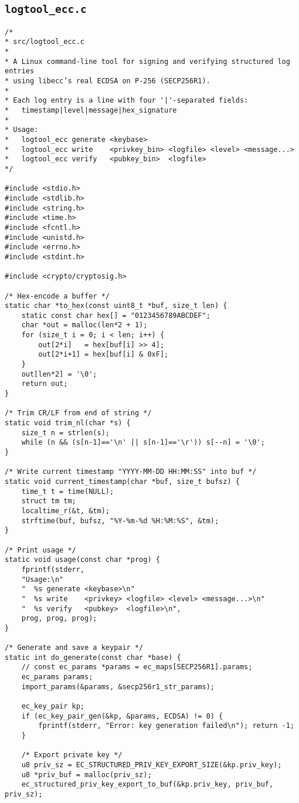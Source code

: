 \subsection*{\texttt{logtool\_ecc.c}}
\begin{lstlisting}[style=cstyle]
/*
* src/logtool_ecc.c
*
* A Linux command-line tool for signing and verifying structured log entries
* using libecc’s real ECDSA on P-256 (SECP256R1).
*
* Each log entry is a line with four '|'-separated fields:
*   timestamp|level|message|hex_signature
*
* Usage:
*   logtool_ecc generate <keybase>
*   logtool_ecc write    <privkey_bin> <logfile> <level> <message...>
*   logtool_ecc verify   <pubkey_bin>  <logfile>
*/

#include <stdio.h>
#include <stdlib.h>
#include <string.h>
#include <time.h>
#include <fcntl.h>
#include <unistd.h>
#include <errno.h>
#include <stdint.h>

#include <crypto/cryptosig.h>

/* Hex-encode a buffer */
static char *to_hex(const uint8_t *buf, size_t len) {
	static const char hex[] = "0123456789ABCDEF";
	char *out = malloc(len*2 + 1);
	for (size_t i = 0; i < len; i++) {
		out[2*i]   = hex[buf[i] >> 4];
		out[2*i+1] = hex[buf[i] & 0xF];
	}
	out[len*2] = '\0';
	return out;
}

/* Trim CR/LF from end of string */
static void trim_nl(char *s) {
	size_t n = strlen(s);
	while (n && (s[n-1]=='\n' || s[n-1]=='\r')) s[--n] = '\0';
}

/* Write current timestamp "YYYY-MM-DD HH:MM:SS" into buf */
static void current_timestamp(char *buf, size_t bufsz) {
	time_t t = time(NULL);
	struct tm tm;
	localtime_r(&t, &tm);
	strftime(buf, bufsz, "%Y-%m-%d %H:%M:%S", &tm);
}

/* Print usage */
static void usage(const char *prog) {
	fprintf(stderr,
	"Usage:\n"
	"  %s generate <keybase>\n"
	"  %s write    <privkey> <logfile> <level> <message...>\n"
	"  %s verify   <pubkey>  <logfile>\n",
	prog, prog, prog);
}

/* Generate and save a keypair */
static int do_generate(const char *base) {
	// const ec_params *params = ec_maps[SECP256R1].params;
	ec_params params;
	import_params(&params, &secp256r1_str_params);
	
	ec_key_pair kp;
	if (ec_key_pair_gen(&kp, &params, ECDSA) != 0) {
		fprintf(stderr, "Error: key generation failed\n"); return -1;
	}
	
	/* Export private key */
	u8 priv_sz = EC_STRUCTURED_PRIV_KEY_EXPORT_SIZE(&kp.priv_key);
	u8 *priv_buf = malloc(priv_sz);
	ec_structured_priv_key_export_to_buf(&kp.priv_key, priv_buf, priv_sz);
	

\end{lstlisting}

